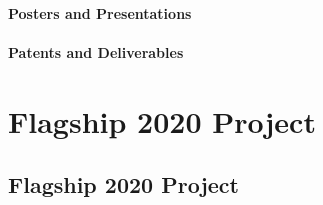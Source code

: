 \documentclass{book}
\begin{document}
\subsection{Posters and Presentations}


\subsection{Patents and Deliverables}



\part{Flagship 2020 Project}


\chapter{Flagship 2020 Project}
\end{document}

